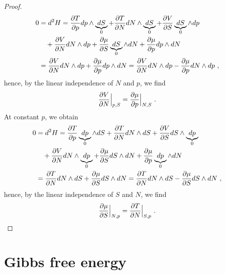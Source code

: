 \begin{proof}
\begin{equation*}
\begin{aligned}
            0 & = d^2 H = \frac{\partial T}{\partial p} dp \wedge \underbrace{dS}_0 + \frac{\partial T}{\partial N} dN \wedge \underbrace{dS}_0 + \frac{\partial V}{\partial S} \underbrace{dS}_0 \wedge dp \\ & \quad + \frac{\partial V}{\partial N} dN \wedge dp + \frac{\partial\mu}{\partial S} \underbrace{dS}_0 \wedge dN + \frac{\partial\mu}{\partial p} dp \wedge dN \\ & = \frac{\partial V}{\partial N} dN \wedge dp + \frac{\partial\mu}{\partial p} dp \wedge dN = \frac{\partial V}{\partial N} dN \wedge dp - \frac{\partial\mu}{\partial p} dN \wedge dp ~,
        \end{aligned}
        \end{equation*}
        hence, by the linear independence of $N$ and $p$, we find
        \begin{equation*}
            \frac{\partial V}{\partial N} \Big \vert_{p,S} = \frac{\partial\mu}{\partial p} \Big \vert_{N, S} ~.
        \end{equation*}
        At constant $p$, we obtain
        \begin{equation*}
        \begin{aligned}
            0 & = d^2 H = \frac{\partial T}{\partial p} \underbrace{dp}_0 \wedge dS + \frac{\partial T}{\partial N} dN \wedge dS + \frac{\partial V}{\partial S} dS \wedge \underbrace{dp}_0 \\ & \quad + \frac{\partial V}{\partial N} dN \wedge \underbrace{dp}_0 + \frac{\partial\mu}{\partial S} dS \wedge dN + \frac{\partial\mu}{\partial p} \underbrace{dp}_0 \wedge dN \\ & = \frac{\partial T}{\partial N} dN \wedge dS + \frac{\partial\mu}{\partial S} dS \wedge dN = \frac{\partial T}{\partial N} dN \wedge dS - \frac{\partial\mu}{\partial S} dS \wedge dN ~,
        \end{aligned}
        \end{equation*}
        hence, by the linear independence of $S$ and $N$, we find
        \begin{equation*}
            \frac{\partial\mu}{\partial S} \Big \vert_{N,p} = \frac{\partial T}{\partial N} \Big \vert_{S, p} ~.
        \end{equation*}
    \end{proof}

\section{Gibbs free energy} 

